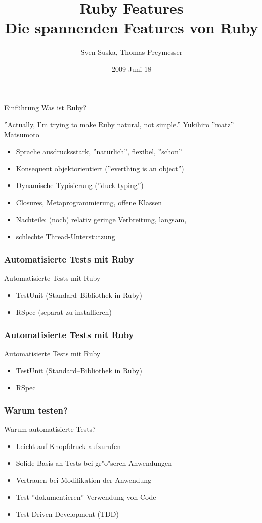 \documentclass{beamer}
\title[Ruby]{Ruby Features\\Die spannenden Features von Ruby}
\author{Sven Suska, Thomas Preymesser}
\date{2009-Juni-18}
\begin{document}
\lstset{language=Ruby}
\lstset{numbers=left, numberstyle=\tiny, numbersep=5pt}
\begin{frame}
\titlepage
\end{frame}


\begin{frame}{Einführung}
Was ist Ruby?

''Actually, I'm trying to make Ruby natural, not simple.''
Yukihiro ''matz'' Matsumoto


\begin{itemize}
\pause \item Sprache ausdrucksstark, ''natürlich'', flexibel, ''schon''
\pause \item Konsequent objektorientiert (''everthing is an object'')
\pause \item Dynamische Typisierung (''duck typing'')
\pause \item Closures, Metaprogrammierung, offene Klassen
\pause \item Nachteile: (noch) relativ geringe Verbreitung, langsam, 
\pause \item schlechte Thread-Unterstutzung
\end{itemize}
\end{frame}

\begin{frame}
  \frametitle{Automatisierte Tests mit Ruby}
  Automatisierte Tests mit Ruby
  \begin{itemize}
    \item<1-> TestUnit (Standard--Bibliothek in Ruby)
    \item<2-> RSpec (separat zu installieren)
  \end{itemize}
\end{frame}

\begin{frame}
  \frametitle{Automatisierte Tests mit Ruby}
  Automatisierte Tests mit Ruby
  \begin{itemize}
    \item TestUnit (Standard--Bibliothek in Ruby)
    \pause
    \item RSpec 
  \end{itemize}
\end{frame}

\begin{frame}

 \frametitle{Warum testen?}
  Warum automatisierte Tests?
  \begin{itemize}
    \item Leicht auf Knopfdruck aufzurufen
    \item Solide Basis an Tests bei gr"o"seren Anwendungen
    \item Vertrauen bei Modifikation der Anwendung
    \item Test ''dokumentieren'' Verwendung von Code
    \item Test-Driven-Development (TDD)
  \end{itemize}
\end{frame}
\end{document}
